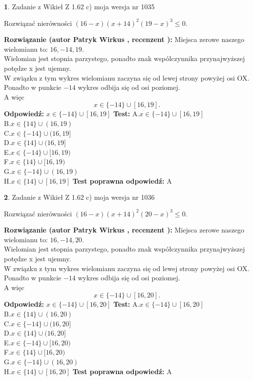 \documentclass[12pt, a4paper]{article}
\theoremstyle{definition} %
\newtheorem{zad}{}
\newcommand{\zadStart}[1]{\begin{zad}#1\newline}
\newcommand{\zadStop}{\end{zad}}
\newcommand{\rozwStart}[2]{\noindent \textbf{Rozwiązanie (autor #1 , recenzent #2): }\newline}
\newcommand{\rozwStop}{\newline}
\newcommand{\odpStart}{\noindent \textbf{Odpowiedź:}\newline}
\newcommand{\odpStop}{\newline}
\newcommand{\testStart}{\noindent \textbf{Test:}\newline}
\newcommand{\testStop}{\newline}
\newcommand{\kluczStart}{\noindent \textbf{Test poprawna odpowiedź:}\newline}
\newcommand{\kluczStop}{\newline}
\begin{document}
\zadStart{Zadanie z Wikieł Z 1.62 c) moja wersja nr 1035}

Rozwiązać nierówności $(16-x)(x+14)^{2}(19-x)^{3}\le0$.
\zadStop
\rozwStart{Patryk Wirkus}{}
Miejsca zerowe naszego wielomianu to: $16, -14, 19$.\\
Wielomian jest stopnia parzystego, ponadto znak współczynnika przy\linebreak najwyższej potędze x jest ujemny.\\ W związku z tym wykres wielomianu zaczyna się od lewej strony powyżej osi OX.\\
Ponadto w punkcie $-14$ wykres odbija się od osi poziomej.\\
A więc $$x \in \{-14\} \cup [16,19].$$
\rozwStop
\odpStart
$x \in \{-14\} \cup [16,19]$
\odpStop
\testStart
A.$x \in \{-14\} \cup [16,19]$\\
B.$x \in \{14\} \cup (16,19)$\\
C.$x \in \{-14\} \cup (16,19]$\\
D.$x \in \{14\} \cup (16,19]$\\
E.$x \in \{-14\} \cup [16,19)$\\
F.$x \in \{14\} \cup [16,19)$\\
G.$x \in \{-14\} \cup (16,19)$\\
H.$x \in \{14\} \cup [16,19]$
\testStop
\kluczStart
A
\kluczStop



\zadStart{Zadanie z Wikieł Z 1.62 c) moja wersja nr 1036}

Rozwiązać nierówności $(16-x)(x+14)^{2}(20-x)^{3}\le0$.
\zadStop
\rozwStart{Patryk Wirkus}{}
Miejsca zerowe naszego wielomianu to: $16, -14, 20$.\\
Wielomian jest stopnia parzystego, ponadto znak współczynnika przy\linebreak najwyższej potędze x jest ujemny.\\ W związku z tym wykres wielomianu zaczyna się od lewej strony powyżej osi OX.\\
Ponadto w punkcie $-14$ wykres odbija się od osi poziomej.\\
A więc $$x \in \{-14\} \cup [16,20].$$
\rozwStop
\odpStart
$x \in \{-14\} \cup [16,20]$
\odpStop
\testStart
A.$x \in \{-14\} \cup [16,20]$\\
B.$x \in \{14\} \cup (16,20)$\\
C.$x \in \{-14\} \cup (16,20]$\\
D.$x \in \{14\} \cup (16,20]$\\
E.$x \in \{-14\} \cup [16,20)$\\
F.$x \in \{14\} \cup [16,20)$\\
G.$x \in \{-14\} \cup (16,20)$\\
H.$x \in \{14\} \cup [16,20]$
\testStop
\kluczStart
A
\kluczStop
\end{document}
